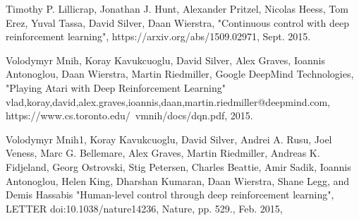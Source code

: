 \documentclass[conference]{IEEEtran}
\begin{document}
\begin{thebibliography}{1}
Timothy P. Lillicrap, Jonathan J. Hunt, Alexander Pritzel, Nicolas Heess, 
Tom Erez, Yuval Tassa, David Silver, Daan Wierstra, 
"Continuous control with deep reinforcement learning", 
https://arxiv.org/abs/1509.02971, Sept. 2015. 

Volodymyr Mnih, Koray Kavukcuoglu, David Silver, Alex Graves,
Ioannis Antonoglou, Daan Wierstra, Martin Riedmiller, Google 
DeepMind Technologies, 
"Playing Atari with Deep Reinforcement Learning"
{vlad,koray,david,alex.graves,ioannis,daan,martin.riedmiller}@deepmind.com, 
https://www.cs.toronto.edu/~vmnih/docs/dqn.pdf, 2015. 

Volodymyr Mnih1, Koray Kavukcuoglu, David Silver, Andrei A. Rusu, 
Joel Veness, Marc G. Bellemare, Alex Graves,
Martin Riedmiller, Andreas K. Fidjeland, Georg Ostrovski, Stig Petersen, 
Charles Beattie, Amir Sadik, Ioannis Antonoglou,
Helen King, Dharshan Kumaran, Daan Wierstra, Shane Legg, and Demis Hassabis
"Human-level control through deep reinforcement
learning", LETTER doi:10.1038/nature14236, Nature, pp. 529., Feb. 2015,   

\end{thebibliography}
\end{document}
